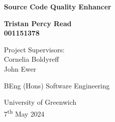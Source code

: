 



\begin{titlepage}
    \begin{center}
        \vspace*{1cm}
            
        \Huge
        \textbf{Source Code Quality Enhancer}
            
            
        \vspace{1.5cm}
            
        \textbf{Tristan Percy Read\\001151378}

        \vspace{0.8cm}
        Project Supervisors:\\
        Cornelia Boldyreff\\
        John Ewer
            
        \vfill
            
        BEng (Hons) Software Engineering
            
        \vspace{0.8cm}
            
        \Large
        University of Greenwich\\
        7\textsuperscript{th} May 2024
    \end{center}
\end{titlepage}
